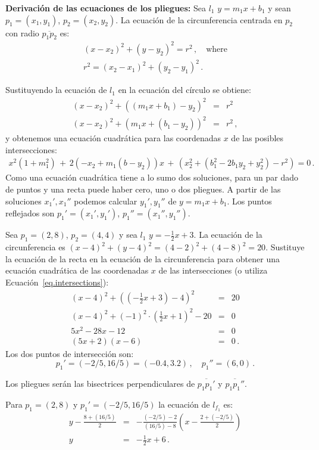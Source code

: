 \noindent\textbf{Derivación de las ecuaciones de los pliegues:}
Sea $l_1$ $y=m_1x + b_1$ y sean $p_1=(x_1,y_1)$, $p_2=(x_2,y_2)$. La ecuación de la circunferencia centrada en $p_2$ con radio $\overline{p_1p_2}$ es:
\begin{eqnarray*}
(x-x_2)^2 + (y-y_2)^2 = r^2\,,\quad \textrm{where}\\
r^2= (x_2-x_1)^2 + (y_2-y_1)^2\,.
\end{eqnarray*}

Sustituyendo la ecuación de $l_1$ en la ecuación del círculo se obtiene:
\begin{eqnarray*}
(x-x_2)^2+((m_1x+b_1)-y_2)^2&=&r^2\\
(x-x_2)^2+(m_1x+(b_1-y_2))^2&=&r^2\,,
\end{eqnarray*}
y obtenemos una ecuación cuadrática para las coordenadas $x$ de las posibles intersecciones:
\begin{align}
x^2(1+m_1^2) \,+\, 2(-x_2+m_1(b-y_2))x \,+\,(x_2^2 + (b_1^2 - 2b_1y_2+y_2^2)-r^2)=0\,.\label{eq.intersections}
\end{align}
Como una ecuación cuadrática tiene a lo sumo dos soluciones, para un par dado de puntos y una recta puede haber cero, uno o dos pliegues. A partir de las soluciones $x_1',x_1''$ podemos calcular $y_1',y_1''$ de $y=m_1x+b_1$. Los puntos reflejados son $p_1'=(x_1',y_1')$, $p_1''=(x_1'',y_1'')$.
\begin{example}
Sea $p_1=(2,8)$, $p_2=(4,4)$ y sea $l_1$ $y=-\frac{1}{2}x +3$. La ecuación de la circunferencia es $(x-4)^2 + (y-4)^2 = (4-2)^2+(4-8)^2=20$. Sustituye la ecuación de la recta en la ecuación de la circunferencia para obtener una ecuación cuadrática de las coordenadas $x$ de las intersecciones (o utiliza Ecuación~\ref{eq.intersections}):
\begin{eqnarray*}
(x-4)^2 + \left(\left(-\frac{1}{2}x+3\right)-4\right)^2&=&20\\
(x-4)^2 + (-1)^2\cdot\left(\frac{1}{2}x+1\right)^2-20&=&0\\
5x^2 -28x -12&=&0\\
(5x+2)(x-6)&=&0\,.
\end{eqnarray*}
Los dos puntos de intersección son:
\[
p_1'=(-2/5,16/5) = (-0.4,3.2)\,,\quad p_1''=(6,0)\,.
\]
\end{example}
Los pliegues serán las bisectrices perpendiculares de $\overline{p_1p_1'}$ y $\overline{p_1p_1''}$.
\begin{example}
Para $p_1=(2,8)$ y $p_1'=(-2/5,16/5)$ la ecuación de $l_{f_1}$ es:
\begin{eqnarray*}
y-\frac{8+(16/5)}{2}&=&-\frac{(-2/5)-2}{(16/5)-8}\left(x-\frac{2+\left(-2/5\right)}{2}\right)\\
y&=&-\frac{1}{2}x+6\,.
\end{eqnarray*}
\end{example}


